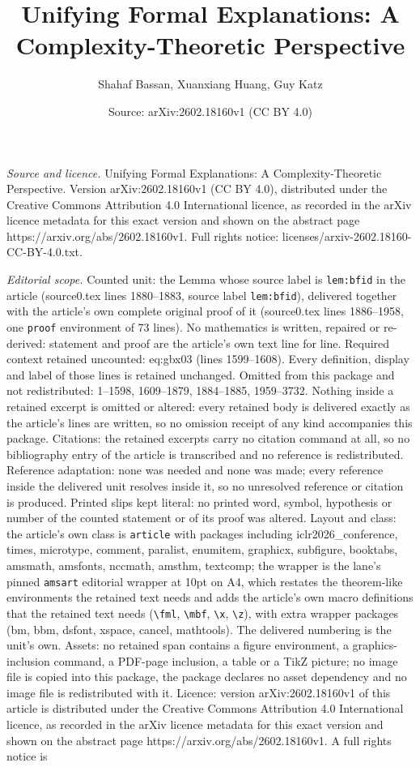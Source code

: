\documentclass[10pt,a4paper]{amsart}
\title[Unifying Formal Explanations: A Complexity-Theoretic Perspec]{Unifying Formal Explanations: A Complexity-Theoretic Perspective}
\author{Shahaf Bassan, Xuanxiang Huang, Guy Katz}
\date{Source: arXiv:2602.18160v1 (CC BY 4.0)}
\begin{document}
\maketitle

\noindent\emph{Source and licence.} Unifying Formal Explanations: A Complexity-Theoretic Perspective. Version arXiv:2602.18160v1 (CC BY 4.0), distributed under the Creative Commons Attribution 4.0 International licence, as recorded in the arXiv licence metadata for this exact version and shown on the abstract page https://arxiv.org/abs/2602.18160v1. Full rights notice: licenses/arxiv-2602.18160-CC-BY-4.0.txt.\par\smallskip

\noindent\textit{Editorial scope.} Counted unit: the Lemma whose source label is \texttt{lem:bfid} in the article (source0.tex lines 1880--1883, source label \texttt{lem:bfid}), delivered together with the article's own complete original proof of it (source0.tex lines 1886--1958, one \texttt{proof} environment of 73 lines). No mathematics is written, repaired or re-derived: statement and proof are the article's own text line for line. Required context retained uncounted: eq:gbx03 (lines 1599--1608). Every definition, display and label of those lines is retained unchanged. Omitted from this package and not redistributed: 1--1598, 1609--1879, 1884--1885, 1959--3732. Nothing inside a retained excerpt is omitted or altered: every retained body is delivered exactly as the article's lines are written, so no omission receipt of any kind accompanies this package. Citations: the retained excerpts carry no citation command at all, so no bibliography entry of the article is transcribed and no reference is redistributed. Reference adaptation: none was needed and none was made; every reference inside the delivered unit resolves inside it, so no unresolved reference or citation is produced. Printed slips kept literal: no printed word, symbol, hypothesis or number of the counted statement or of its proof was altered. Layout and class: the article's own class is \texttt{article} with packages including iclr2026\_conference, times, microtype, comment, paralist, enumitem, graphicx, subfigure, booktabs, amsmath, amsfonts, nccmath, amsthm, textcomp; the wrapper is the lane's pinned \texttt{amsart} editorial wrapper at 10pt on A4, which restates the theorem-like environments the retained text needs and adds the article's own macro definitions that the retained text needs (\texttt{\textbackslash fml}, \texttt{\textbackslash mbf}, \texttt{\textbackslash x}, \texttt{\textbackslash z}), with extra wrapper packages (bm, bbm, dsfont, xspace, cancel, mathtools). The delivered numbering is the unit's own. Assets: no retained span contains a figure environment, a graphics-inclusion command, a PDF-page inclusion, a table or a TikZ picture; no image file is copied into this package, the package declares no asset dependency and no image file is redistributed with it. Licence: version arXiv:2602.18160v1 of this article is distributed under the Creative Commons Attribution 4.0 International licence, as recorded in the arXiv licence metadata for this exact version and shown on the abstract page https://arxiv.org/abs/2602.18160v1. A full rights notice is 
\end{document}
